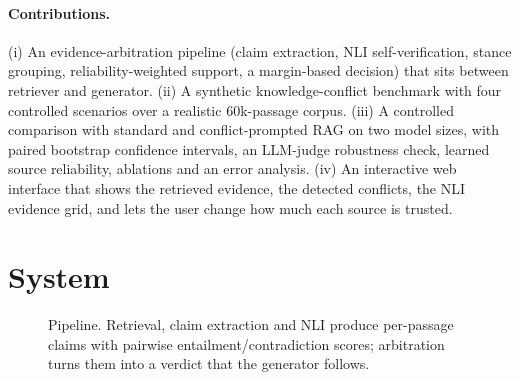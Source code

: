 \documentclass[11pt]{article}
\begin{document}
\paragraph{Contributions.} (i) An evidence-arbitration pipeline (claim extraction, NLI
self-verification, stance grouping, reliability-weighted support, a margin-based decision) that
sits between retriever and generator. (ii) A synthetic knowledge-conflict benchmark with four
controlled scenarios over a realistic 60k-passage corpus. (iii) A controlled comparison with
standard and conflict-prompted RAG on two model sizes, with paired bootstrap confidence intervals,
an LLM-judge robustness check, learned source reliability, ablations and an error analysis.
(iv) An interactive web interface that shows the retrieved evidence, the detected conflicts, the
NLI evidence grid, and lets the user change how much each source is trusted.

\section{System}
\begin{figure}[t]
\centering
{}
\caption{Pipeline. Retrieval, claim extraction and NLI produce per-passage claims with pairwise
entailment/contradiction scores; arbitration turns them into a verdict that the generator follows.}
\label{fig:pipeline}
\end{figure}
\end{document}
